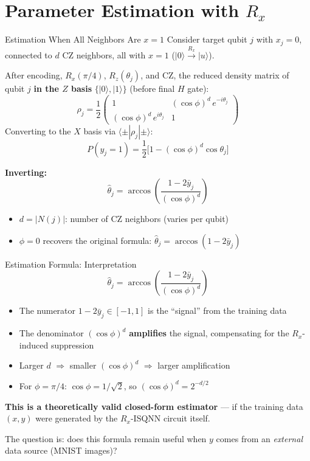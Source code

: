 \documentclass[aspectratio=169]{beamer}
\newcommand{\ket}[1]{\lvert #1\rangle}
\begin{document}
\section{Parameter Estimation with $R_x$}

\begin{frame}{Estimation When All Neighbors Are $x=1$}
  \small
  Consider target qubit $j$ with $x_j=0$, connected to $d$ CZ neighbors, all with $x=1$ ($\ket{0}\xrightarrow{R_x}\ket{u}$).

  \vspace{0.3em}
  After encoding, $R_x(\pi/4)$, $R_z(\theta_j)$, and CZ, the reduced density matrix of qubit $j$ \textbf{in the $Z$ basis} $\{\ket{0},\ket{1}\}$ (before final $H$ gate):
  \[
  \rho_j = \frac12\begin{pmatrix}
    1 & (\cos\phi)^d\, e^{-i\theta_j} \\[4pt]
    (\cos\phi)^d\, e^{i\theta_j} & 1
  \end{pmatrix}
  \]
  Converting to the $X$ basis via $\langle\pm|\rho_j|\pm\rangle$:
  \[
  P(y_j=1) = \frac{1}{2}\big[1 - (\cos\phi)^{d}\cos\theta_j\big]
  \]

  \textbf{Inverting:}
  \[
  \boxed{\hat\theta_j = \arccos\!\left(\frac{1 - 2\bar y_j}{(\cos\phi)^{d}}\right)}
  \]
  \begin{itemize}
    \item $d = |N(j)|$: number of CZ neighbors (varies per qubit)
    \item $\phi=0$ recovers the original formula: $\hat\theta_j = \arccos(1-2\bar y_j)$
  \end{itemize}
\end{frame}

\begin{frame}{Estimation Formula: Interpretation}
  \small
  \[
  \hat\theta_j = \arccos\!\left(\frac{1 - 2\bar y_j}{(\cos\phi)^{d}}\right)
  \]
  \begin{itemize}
    \item The numerator $1-2\bar y_j \in [-1,1]$ is the ``signal'' from the training data
    \item The denominator $(\cos\phi)^{d}$ \textbf{amplifies} the signal, compensating for the $R_x$-induced suppression
    \item Larger $d$ $\Rightarrow$ smaller $(\cos\phi)^d$ $\Rightarrow$ larger amplification
    \item For $\phi=\pi/4$: $\cos\phi = 1/\sqrt{2}$, so $(\cos\phi)^d = 2^{-d/2}$
  \end{itemize}

  \vspace{0.3em}
  \textbf{This is a theoretically valid closed-form estimator} --- if the training data $(x,y)$ were generated by the $R_x$-ISQNN circuit itself.

  \vspace{0.3em}
  The question is: does this formula remain useful when $y$ comes from an \emph{external} data source (MNIST images)?
\end{frame}
\end{document}

